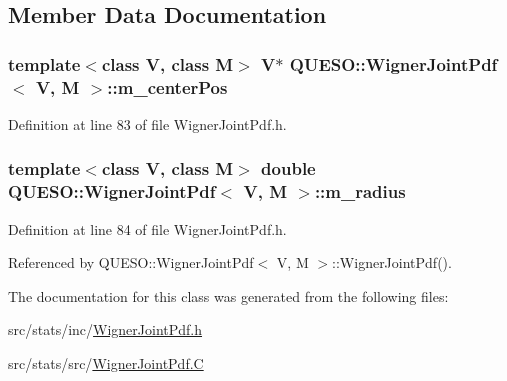 \subsection{Member Data Documentation}
\hypertarget{class_q_u_e_s_o_1_1_wigner_joint_pdf_abca40c4e75cf4429fbbe8ef077282ce8}{
\subsubsection[{m\-\_\-center\-Pos}]{\setlength{\rightskip}{0pt plus 5cm}template$<$class V, class M$>$ V$\ast$ {\bf Q\-U\-E\-S\-O\-::\-Wigner\-Joint\-Pdf}$<$ V, M $>$\-::m\-\_\-center\-Pos\hspace{0.3cm}{\ttfamily [protected]}}}\label{class_q_u_e_s_o_1_1_wigner_joint_pdf_abca40c4e75cf4429fbbe8ef077282ce8}


Definition at line 83 of file Wigner\-Joint\-Pdf.\-h.

\hypertarget{class_q_u_e_s_o_1_1_wigner_joint_pdf_a05e7841821be3fea3990e64f40af813d}{
\subsubsection[{m\-\_\-radius}]{\setlength{\rightskip}{0pt plus 5cm}template$<$class V, class M$>$ double {\bf Q\-U\-E\-S\-O\-::\-Wigner\-Joint\-Pdf}$<$ V, M $>$\-::m\-\_\-radius\hspace{0.3cm}{\ttfamily [protected]}}}\label{class_q_u_e_s_o_1_1_wigner_joint_pdf_a05e7841821be3fea3990e64f40af813d}


Definition at line 84 of file Wigner\-Joint\-Pdf.\-h.



Referenced by Q\-U\-E\-S\-O\-::\-Wigner\-Joint\-Pdf$<$ V, M $>$\-::\-Wigner\-Joint\-Pdf().



The documentation for this class was generated from the following files\-:\begin{DoxyCompactItemize}
\item 
src/stats/inc/\hyperlink{_wigner_joint_pdf_8h}{Wigner\-Joint\-Pdf.\-h}\item 
src/stats/src/\hyperlink{_wigner_joint_pdf_8_c}{Wigner\-Joint\-Pdf.\-C}\end{DoxyCompactItemize}

